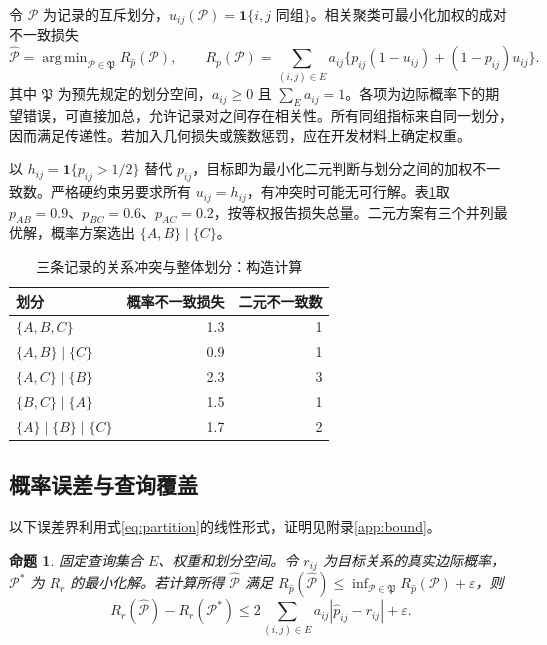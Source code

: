 \documentclass[UTF8,a4paper,zihao=-4,fontset=fandol]{ctexart}
\newcommand{\ind}{\mathbf 1}
\DeclareMathOperator*{\argmin}{arg\,min}
\newtheorem{proposition}{命题}
\begin{document}
令 $\mathcal P$ 为记录的互斥划分，$u_{ij}(\mathcal P)=\ind\{i,j\text{ 同组}\}$。相关聚类可最小化加权的成对不一致损失\citep{bansal2004}
\begin{equation}
 \widehat{\mathcal P}=\argmin_{\mathcal P\in\mathfrak P}
 R_{\widehat p}(\mathcal P),\qquad
 R_p(\mathcal P)=\sum_{(i,j)\in E}a_{ij}
 \{p_{ij}(1-u_{ij})+(1-p_{ij})u_{ij}\}.
 \label{eq:partition}
\end{equation}
其中 $\mathfrak P$ 为预先规定的划分空间，$a_{ij}\geq0$ 且 $\sum_Ea_{ij}=1$。各项为边际概率下的期望错误，可直接加总，允许记录对之间存在相关性。所有同组指标来自同一划分，因而满足传递性。若加入几何损失或簇数惩罚，应在开发材料上确定权重。

以 $h_{ij}=\ind\{p_{ij}>1/2\}$ 替代 $p_{ij}$，目标即为最小化二元判断与划分之间的加权不一致数。严格硬约束另要求所有 $u_{ij}=h_{ij}$，有冲突时可能无可行解。表\ref{tab:three}取 $p_{AB}=0.9$、$p_{BC}=0.6$、$p_{AC}=0.2$，按等权报告损失总量。二元方案有三个并列最优解，概率方案选出 $\{A,B\}\mid\{C\}$。

\begin{table}[htbp]
\centering\small
\caption{三条记录的关系冲突与整体划分：构造计算}\label{tab:three}
\begin{tabular}{@{}lrr@{}}
\toprule
划分 & 概率不一致损失 & 二元不一致数 \\
\midrule
$\{A,B,C\}$ & 1.3 & 1 \\
$\{A,B\}\mid\{C\}$ & 0.9 & 1 \\
$\{A,C\}\mid\{B\}$ & 2.3 & 3 \\
$\{B,C\}\mid\{A\}$ & 1.5 & 1 \\
$\{A\}\mid\{B\}\mid\{C\}$ & 1.7 & 2 \\
\bottomrule
\end{tabular}
\end{table}

\subsection{概率误差与查询覆盖}

以下误差界利用式\eqref{eq:partition}的线性形式，证明见附录\ref{app:bound}。

\begin{proposition}\label{prop:bound}
固定查询集合 $E$、权重和划分空间。令 $r_{ij}$ 为目标关系的真实边际概率，$\mathcal P^*$ 为 $R_r$ 的最小化解。若计算所得 $\widehat{\mathcal P}$ 满足
$R_{\widehat p}(\widehat{\mathcal P})\leq\inf_{\mathcal P\in\mathfrak P}R_{\widehat p}(\mathcal P)+\varepsilon$，则
\begin{equation}
 R_r(\widehat{\mathcal P})-R_r(\mathcal P^*)
 \leq 2\sum_{(i,j)\in E}a_{ij}|\widehat p_{ij}-r_{ij}|+\varepsilon.
 \label{eq:bound}
\end{equation}
\end{proposition}
\end{document}
